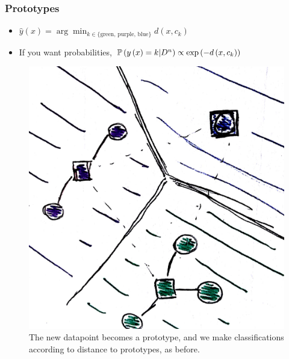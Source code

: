 \documentclass[10pt,mathserif]{beamer}
\begin{document}
\begin{frame}
  \frametitle{Prototypes}
 \begin{itemize}
 \item $\hat{y}\left(x\right) = \arg\min_{k \in \{\text{green, purple, blue}\}} d\left(x, c_k\right)$
 \item If you want probabilities, $\mathbb{P}\left({y\left(x\right) = k \vert D^n}\right) \propto \operatorname{exp}\left(-d\left(x, c_k \right)\right)$
 \end{itemize} 
\begin{figure}[ht]
  \centering
  \includegraphics[width=0.35\paperwidth]{figure/prototypes_5}
  \caption{The new datapoint becomes a prototype, and we make classifications
    according to distance to prototypes, as before.\label{fig:prototypes_5} }
\end{figure}
\end{frame}
\end{document}
